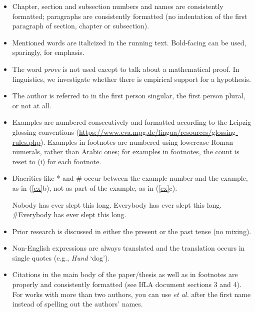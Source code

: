 \documentclass[11pt,fleqn,a4paper/thesis]{article}
\def\infelic{{\leavevmode\llap{\#}}}
\newcommand{\6}{\mbox{$[\hspace*{-.6mm}[$}}
\newcommand{\9}{\mbox{$]\hspace*{-.6mm}]$}}
\begin{document}
\begin{itemize}[itemsep=-1pt,leftmargin=2.5ex,topsep=-2pt]
\item Chapter, section and subsection numbers and names are consistently formatted; paragraphs are consistently formatted (no indentation of the first paragraph of section, chapter or subsection).

\item Mentioned words are italicized in the running text. Bold-facing can be used, sparingly, for emphasis.

\item The word {\em prove} is not used except to talk about a mathematical proof. In linguistics, we investigate whether there is empirical support for a hypothesis. 

\item The author is referred to in the first person singular, the first person plural, or not at all.

\item Examples are numbered consecutively and formatted according to the Leipzig glossing conventions (\url{https://www.eva.mpg.de/lingua/resources/glossing-rules.php}). Examples in footnotes are numbered using lowercase Roman numerals, rather than Arabic ones; for examples in footnotes, the count is reset to (i) for each footnote.

\item Diacritics like * and \# occur between the example number and the example, as in (\ref{ex}b), not as part of the example, as in (\ref{ex}c).

\begin{exe}
\ex\label{ex}
\begin{xlist}
\ex Nobody has ever slept this long.
\ex \infelic Everybody has ever slept this long.
\ex \#Everybody has ever slept this long.
\end{xlist}
\end{exe}

\item Prior research is discussed in either the present or the past tense (no mixing).

\item Non-English expressions are always translated and the translation occurs in single quotes (e.g., {\em Hund} `dog').

\item Citations in the main body of the paper/thesis as well as in footnotes are properly and consistently formatted (see IfLA document sections 3 and 4). For works with more than two authors, you can use {\em et al.} after the first name instead of spelling out the authors' names. 


\end{itemize}
\end{document}
